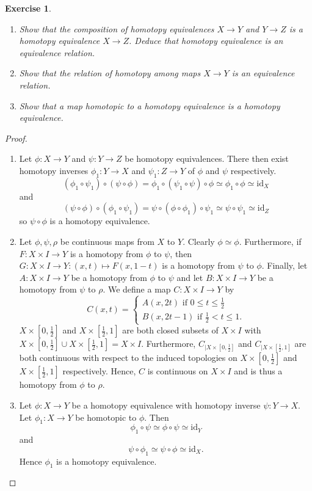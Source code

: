 \documentclass{article}
\newtheorem{exercise}{Exercise}[subsection]
\begin{document}
\begin{exercise}
\begin{enumerate}
\item[(a)] Show that the composition of homotopy equivalences $X\to Y$ and $Y\to Z$ is a homotopy equivalence $X\to Z$. Deduce that homotopy equivalence is an equivalence relation.
\item[(b)] Show that the relation of homotopy among maps $X\to Y$ is an equivalence relation.
\item[(c)] Show that a map homotopic to a homotopy equivalence is a homotopy equivalence.
\end{enumerate}
\end{exercise}
\begin{proof}
\begin{enumerate}
\item[(a)] Let $\phi:X\to Y$ and $\psi: Y\to Z$ be homotopy equivalences. There then exist homotopy inverses $\phi_1:Y\to X$ and $\psi_1: Z\to Y$ of $\phi$ and $\psi$ respectively.\[(\phi_1\circ\psi_1)\circ(\psi\circ\phi)= \phi_1\circ(\psi_1\circ\psi)\circ\phi\simeq\phi_1\circ\phi\simeq\text{id}_X\] and\[(\psi\circ\phi)\circ(\phi_1\circ\psi_1)=\psi\circ(\phi\circ\phi_1)\circ\psi_1\simeq\psi\circ\psi_1\simeq\text{id}_Z\]so $\psi\circ\phi$ is a homotopy equivalence.
\item[(b)] Let $\phi,\psi,\rho$ be continuous maps from $X$ to $Y$. Clearly $\phi\simeq\phi$. Furthermore, if $F:X\times I\to Y$ is a homotopy from $\phi$ to $\psi$, then $G:X\times I\to Y:(x,t)\mapsto F(x,1-t)$ is a homotopy from $\psi$ to $\phi$. Finally, let $A:X\times I\to Y$ be a homotopy from $\phi$ to $\psi$ and let $B:X\times I\to Y$ be a homotopy from $\psi$ to $\rho$. We define a map $C:X\times I\to Y$ by \[C(x,t)=\begin{cases}
    A(x,2t)\text{ if }0\leq t\leq \frac{1}{2}\\B(x,2t-1)\text{ if }\frac{1}{2}<t\leq 1.
\end{cases}\]$X\times[0,\frac{1}{2}]$ and $X\times[\frac{1}{2},1]$ are both closed subsets of $X\times I$ with $X\times[0,\frac{1}{2}]\cup X\times[\frac{1}{2},1]=X\times I$. Furthermore, $C_{|{X\times[0,\frac{1}{2}]}}$ and $C_{|{X\times[\frac{1}{2},1]}}$ are both continuous with respect to the induced topologies on $X\times[0,\frac{1}{2}]$ and $X\times[\frac{1}{2},1]$ respectively. Hence, $C$ is continuous on $X\times I$ and is thus a homotopy from $\phi$ to $\rho$.
\item[(c)] Let $\phi:X\to Y$ be a homotopy equivalence with homotopy inverse $\psi:Y\to X$. Let $\phi_1:X\to Y$ be homotopic to $\phi$. Then \[\phi_1\circ\psi\simeq\phi\circ\psi\simeq\text{id}_Y\] and \[\psi\circ\phi_1\simeq\psi\circ\phi\simeq\text{id}_X.\] Hence $\phi_1$ is a homotopy equivalence.
\end{enumerate}
\end{proof}
\end{document}
